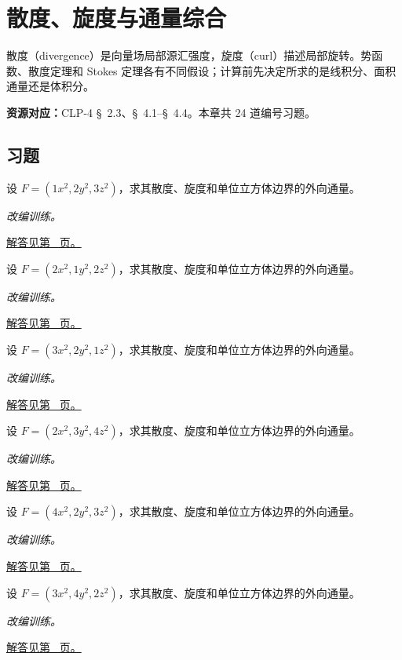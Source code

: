 \documentclass[12pt,fontset=fandol]{ctexart}
\begin{document}
\clearpage
\section{散度、旋度与通量综合}\label{sec:ch44}
散度（divergence）是向量场局部源汇强度，旋度（curl）描述局部旋转。势函数、散度定理和 Stokes 定理各有不同假设；计算前先决定所求的是线积分、面积通量还是体积分。

\textbf{资源对应：}CLP-4 \S~2.3、\S~4.1--\S~4.4。本章共 24 道编号习题。
\subsection{习题}
\begin{example}[立方体上的多项式通量]\label{ex:c44q1}
设 $F=(1x^2,2y^2,3z^2)$，求其散度、旋度和单位立方体边界的外向通量。
\par\textit{改编训练。}\par\hyperref[ans:c44q1]{解答见第~\pageref{ans:c44q1} 页。}
\end{example}
\begin{example}[立方体上的多项式通量]\label{ex:c44q2}
设 $F=(2x^2,1y^2,2z^2)$，求其散度、旋度和单位立方体边界的外向通量。
\par\textit{改编训练。}\par\hyperref[ans:c44q2]{解答见第~\pageref{ans:c44q2} 页。}
\end{example}
\begin{example}[立方体上的多项式通量]\label{ex:c44q3}
设 $F=(3x^2,2y^2,1z^2)$，求其散度、旋度和单位立方体边界的外向通量。
\par\textit{改编训练。}\par\hyperref[ans:c44q3]{解答见第~\pageref{ans:c44q3} 页。}
\end{example}
\begin{example}[立方体上的多项式通量]\label{ex:c44q4}
设 $F=(2x^2,3y^2,4z^2)$，求其散度、旋度和单位立方体边界的外向通量。
\par\textit{改编训练。}\par\hyperref[ans:c44q4]{解答见第~\pageref{ans:c44q4} 页。}
\end{example}
\begin{example}[立方体上的多项式通量]\label{ex:c44q5}
设 $F=(4x^2,2y^2,3z^2)$，求其散度、旋度和单位立方体边界的外向通量。
\par\textit{改编训练。}\par\hyperref[ans:c44q5]{解答见第~\pageref{ans:c44q5} 页。}
\end{example}
\begin{example}[立方体上的多项式通量]\label{ex:c44q6}
设 $F=(3x^2,4y^2,2z^2)$，求其散度、旋度和单位立方体边界的外向通量。
\par\textit{改编训练。}\par\hyperref[ans:c44q6]{解答见第~\pageref{ans:c44q6} 页。}
\end{example}
\end{document}
